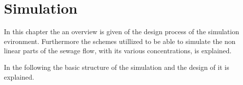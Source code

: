 \chapter{Simulation}\label{ch:simulation}
In this chapter the an overview is given of the design process of the simulation evironment. Furthermore the schemes utillized to be able to simulate the non linear parts of the sewage flow, with its various concentrations, is explained.

In the following the basic structure of the simulation and the design of it is explained.